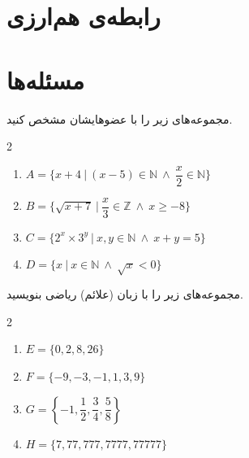 \section{رابطه‌ی هم‌ارزی}

\section{مسئله‌ها}
\begin{problem} \label{seprmozv}
	مجموعه‌های زیر را با عضوهایشان مشخص کنید.
	\vspace{-5mm}
	\begin{multicols}{2}
		\begin{enumerate}
			\item 
			$A=\{x+4 \ | \ (x-5) \in \mathbb{N} \ \wedge \ \dfrac{x}{2} \in \mathbb{N}\}$
			\item 
			$B=\{\sqrt{x+7} \ | \ \dfrac{x}{3} \in \mathbb{Z} \ \wedge \ x \geq -8\}$
			\item 
			$C=\{2^x \times 3^y \ | \ x,y \in \mathbb{N} \ \wedge \ x+y=5\}$
			\item 
			$D=\{x \ | \ x \in \mathbb{N} \ \wedge \ \sqrt{x}<0\}$
		\end{enumerate}
	\end{multicols}
	\vspace{1pt}
\end{problem}

\begin{problem} \label{seprmar}
	مجموعه‌های زیر را با زبان (علائم) ریاضی بنویسید.
	\vspace{-5mm}
	\begin{multicols}{2}
		\begin{enumerate}
			\item 
			$E=\{0,2,8,26\}$
			\item 
			$F=\{-9,-3,-1,1,3,9\}$
			\item 
			$G=\left\{-1, \dfrac{1}{2}, \dfrac{3}{4}, \dfrac{5}{8}\right\}$
			\item 
			$H=\{7,77,777,7777,77777\}$
		\end{enumerate}
	\end{multicols}
	\vspace{1pt}
\end{problem}

